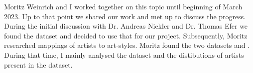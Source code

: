 

Moritz Weinrich and I worked together on this topic until beginning of March 2023. Up to that point we shared our work and met up to discuss the progress.
During the initial discussion with Dr. Andreas Niekler and Dr. Thomas Efer we found the dataset \autocite{poloclub-diffusiondb} and decided to use that for our project.
Subsequently, Moritz researched mappings of artists to art-styles. Moritz found the two datasets \autocite{thelist} and \autocite{wikipedia-styles}.
During that time, I mainly analysed the \autocite{poloclub-diffusiondb} dataset and the distibutions of artists present in the dataset.